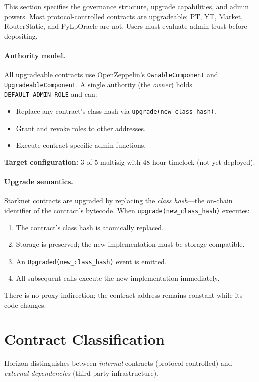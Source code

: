 
This section specifies the governance structure, upgrade capabilities, and admin powers. Most protocol-controlled contracts are upgradeable; PT, YT, Market, RouterStatic, and PyLpOracle are not. Users must evaluate admin trust before depositing.

\paragraph{Authority model.}
All upgradeable contracts use OpenZeppelin's \texttt{OwnableComponent} and \texttt{UpgradeableComponent}. A single authority (the \emph{owner}) holds \texttt{DEFAULT\_ADMIN\_ROLE} and can:
\begin{itemize}
\item Replace any contract's class hash via \texttt{upgrade(new\_class\_hash)}.
\item Grant and revoke roles to other addresses.
\item Execute contract-specific admin functions.
\end{itemize}

\noindent\textbf{Target configuration:} 3-of-5 multisig with 48-hour timelock (not yet deployed).

\paragraph{Upgrade semantics.}
Starknet contracts are upgraded by replacing the \emph{class hash}---the on-chain identifier of the contract's bytecode. When \texttt{upgrade(new\_class\_hash)} executes:
\begin{enumerate}
\item The contract's class hash is atomically replaced.
\item Storage is preserved; the new implementation must be storage-compatible.
\item An \texttt{Upgraded(new\_class\_hash)} event is emitted.
\item All subsequent calls execute the new implementation immediately.
\end{enumerate}
There is no proxy indirection; the contract address remains constant while its code changes.


\section{Contract Classification}

Horizon distinguishes between \emph{internal} contracts (protocol-controlled) and \emph{external dependencies} (third-party infrastructure).

